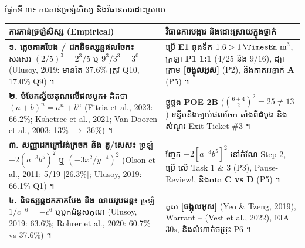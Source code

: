 \documentclass[a4paper,10pt]{article}
\renewcommand{\arraystretch}{1.14}
\newcommand{\en}[1]{{\TimesEn #1}}
\newcommand{\unit}[1]{\,\text{\en{#1}}}
\newcommand{\cnum}[1]{{\fontsize{10pt}{11.5pt}\selectfont\ding{\numexpr181+#1\relax}}}
\begin{document}
\vspace{6pt}
{\muol ផ្នែកទី ៣៖ ការភាន់ច្រឡំសិស្ស និងវិធានការដោះស្រាយ}\\[4pt]
{\fontsize{9.2pt}{13.6pt}\selectfont\renewcommand{\arraystretch}{1.22}%
\begin{tabular}{|L{7.65cm}|L{10.90cm}|}
\hline
{}
\textbf{ការភាន់ច្រឡំសិស្ស (\en{Empirical})} & \textbf{វិធានការបង្ការ និងដោះស្រាយក្នុងថ្នាក់} \\
\hline
\textbf{១. ភ្លេចភាគបែង / ដកនិទស្សន្តផលចែក៖} សរសេរ $(2/5)^3 = 2^3/5$ ឬ $9^3/3^3 = 3^0$ (\en{Ulusoy, 2019}: មានតែ 37.6\% ត្រូវ \en{Q10}, 17.0\% \en{Q9}) ។ & ប្រើ \textbf{\en{E1}} ធុងទឹក $1.6>1\unit{m}^3$, ក្រឡា \textbf{\en{P1 1:1}} ($4/25$ និង $9/16$), ដ្យាក្រាម \textbf{[ចង្អុលអូស]} (\en{P2}), និងកាតអន្ទាក់ \textbf{\en{A}} (\en{P5}) ។ \\
\hline
\textbf{២. បំបែកស្វ័យគុណលើផលបូក៖} គិតថា $(a+b)^n = a^n+b^n$ (\en{Fitria et al., 2023}: 66.2\%; \en{Kshetree et al., 2021}; \en{Van Dooren et al., 2003}: 13\% $\to$ 36\%) ។ & ផ្គូផ្គង \textbf{\en{POE 2B}} ($\left(\frac{6+4}{2}\right)^2=25 \neq 13$) ទន្ទឹមនឹងច្បាប់ផលចែក \cnum{1} តាំងពីដំបូង និងសំណួរ \en{Exit Ticket \#3} ។ \\
\hline
\textbf{៣. សញ្ញាដកក្រៅវង់ក្រចក និង គូ/សេស៖} ច្រឡំ $-2(a^{-3}b^5)^2$ ឬ $(-3x^2/y^{-4})^2$ (\en{Olson et al., 2011}: 5/19 [26.3\%]; \en{Ulusoy, 2019}: 66.1\% \en{Q1}) ។ & ញែក $-2[a^{-3}b^5]^2$ នៅកំណែ \en{Step 2}, ប្រើ \cnum{5} លើ \en{Task 1 \& 3} (\en{P3}), \en{Pause-Review!}, និងកាត \textbf{\en{C vs D}} (\en{P5}) ។ \\
\hline
\textbf{៤. និទស្សន្តដកភាគបែង និង លាយរូបមន្ត៖} ច្រឡំ $1/c^{-6}=-c^6$ ឬបូកជំនួសគុណ (\en{Ulusoy, 2019}: 63.6\%; \en{Rohrer et al., 2020}: 60.7\% vs 37.6\%) ។ & គូស \textbf{[ចង្អុលអូស]} (\en{Yeo \& Tzeng, 2019}), \en{Warrant} \cnum{1}--\cnum{5} (\en{Vest et al., 2022}), \en{EIA 30s}, និងលំហាត់ចម្រុះ \en{P6} ។ \\
\hline
\end{tabular}}
\end{document}
